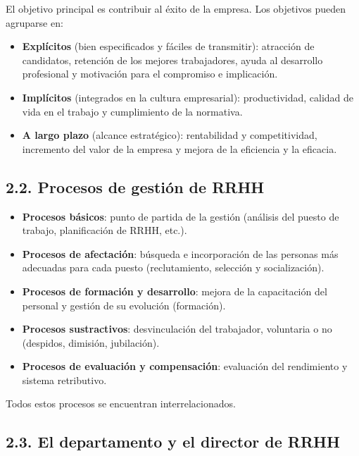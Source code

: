 \documentclass[12pt]{book} %
\providecommand{\tightlist}{%
  \setlength{\itemsep}{0pt}\setlength{\parskip}{0pt}}
\begin{document}
El objetivo principal es contribuir al éxito de la empresa. Los
objetivos pueden agruparse en:

\begin{itemize}
\tightlist
\item
  \textbf{Explícitos} (bien especificados y fáciles de transmitir):
  atracción de candidatos, retención de los mejores trabajadores, ayuda
  al desarrollo profesional y motivación para el compromiso e
  implicación.
\item
  \textbf{Implícitos} (integrados en la cultura empresarial):
  productividad, calidad de vida en el trabajo y cumplimiento de la
  normativa.
\item
  \textbf{A largo plazo} (alcance estratégico): rentabilidad y
  competitividad, incremento del valor de la empresa y mejora de la
  eficiencia y la eficacia.
\end{itemize}

\hypertarget{procesos-de-gestiuxf3n-de-rrhh}{%
\subsection{2.2. Procesos de gestión de
RRHH}\label{procesos-de-gestiuxf3n-de-rrhh}}

\begin{itemize}
\tightlist
\item
  \textbf{Procesos básicos}: punto de partida de la gestión (análisis
  del puesto de trabajo, planificación de RRHH, etc.).
\item
  \textbf{Procesos de afectación}: búsqueda e incorporación de las
  personas más adecuadas para cada puesto (reclutamiento, selección y
  socialización).
\item
  \textbf{Procesos de formación y desarrollo}: mejora de la capacitación
  del personal y gestión de su evolución (formación).
\item
  \textbf{Procesos sustractivos}: desvinculación del trabajador,
  voluntaria o no (despidos, dimisión, jubilación).
\item
  \textbf{Procesos de evaluación y compensación}: evaluación del
  rendimiento y sistema retributivo.
\end{itemize}

Todos estos procesos se encuentran interrelacionados.

\hypertarget{el-departamento-y-el-director-de-rrhh}{%
\subsection{2.3. El departamento y el director de
RRHH}\label{el-departamento-y-el-director-de-rrhh}}
\end{document}
